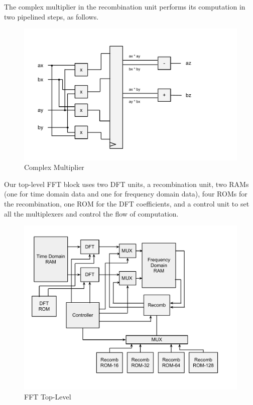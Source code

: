 \documentclass{article}
\begin{document}
The complex multiplier in the recombination unit performs its computation
in two pipelined steps, as follows.

\begin{figure}[H]
	\centering
	\includegraphics[scale=0.4]{complex-mult}
	\caption{Complex Multiplier}
\end{figure}

Our top-level FFT block uses two DFT units, a recombination unit,
two RAMs (one for time domain data and one for frequency domain data),
four ROMs for the recombination, one ROM for the DFT coefficients, and
a control unit to set all the multiplexers and control the flow of
computation.

\begin{figure}[H]
	\centering
	\includegraphics[scale=0.35]{fft-top}
	\caption{FFT Top-Level}
\end{figure}
\end{document}
